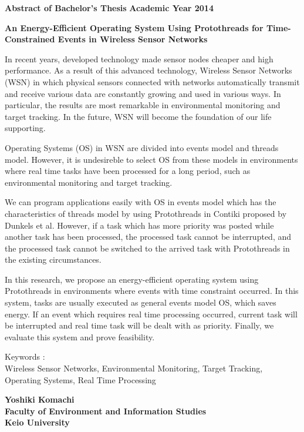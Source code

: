 \newpage

\begin{center}
\textbf{\Large Abstract of Bachelor's Thesis}
\textbf{\Large Academic Year 2014}
\vspace{6.18mm}

\textbf{\Large An Energy-Efficient Operating System Using Protothreads for Time-Constrained Events in Wireless Sensor Networks}
\end{center}

\vspace{10mm}

In recent years, 
developed technology made 
sensor nodes cheaper and high performance.
As a result of this advanced technology, 
Wireless Sensor Networks (WSN) 
in which physical sensors connected with networks
automatically transmit and receive various data 
are constantly growing and used in various ways.
In particular, the results are most remarkable
in environmental monitoring and target tracking.
In the future, WSN will become the foundation of our life supporting. 

Operating Systems (OS) in WSN
are divided into events model and threads model.
However, it is undesireble to 
select OS from these models  
in environments where 
real time tasks have been processed 
for a long period,
such as environmental monitoring and target tracking.

We can program applications easily
with OS
in events model which
has the characteristics of threads model
by using Protothreads 
in Contiki proposed by Dunkels et al.
However, 
if a task which has more priority was posted 
while another task has been processed,
the processed task cannot be interrupted,
and the processed task cannot be switched to the arrived task 
with Protothreads
in the existing circumstances.

In this research, we propose an energy-efficient operating system 
using Protothreads
in environments where events with time constraint occurred.
In this system,
tasks are usually executed as general events model OS, 
which saves energy.
If an event which requires real time processing occurred,
current task will be interrupted and 
real time task will be dealt with as priority.
Finally, we evaluate this system and prove feasibility.


\vspace{10mm}
Keywords :\\
\hspace{3.5em}Wireless Sensor Networks, Environmental Monitoring, Target Tracking, Operating Systems, Real Time Processing 
\begin{flushright}
\textbf{Yoshiki Komachi}\\
\vspace{5mm}
\textbf{Faculty of Environment and Information Studies}\\
\textbf{Keio University}
\end{flushright}
